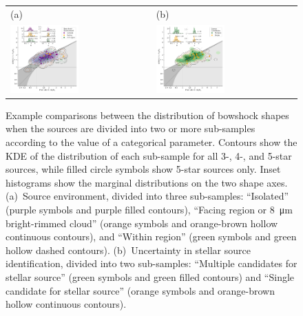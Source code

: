 \begin{figure}
  \setlength\tabcolsep{0pt}
  \begin{tabular}{ll}
    (a) & (b) \\
    \includegraphics[width=0.5\textwidth]{figs/mipsgal-Rc-R90-environment} &
    \includegraphics[width=0.5\textwidth]{figs/mipsgal-Rc-R90-candidates} 
  \end{tabular}
  \caption[]{Example comparisons between the distribution of bowshock
    shapes when the sources are divided into two or more sub-samples
    according to the value of a categorical parameter.  Contours show
    the KDE of the distribution of each sub-sample for all 3-, 4-, and
    5-star sources, while filled circle symbols show 5-star sources
    only. Inset histograms show the marginal distributions on the two
    shape axes. (a)~Source environment, divided into three
    sub-samples: ``Isolated'' (purple symbols and purple filled
    contours), ``Facing \hii{} region or \SI{8}{\um} bright-rimmed
    cloud'' (orange symbols and orange-brown hollow continuous
    contours), and ``Within \hii{} region'' (green symbols and green
    hollow dashed contours). (b)~Uncertainty in stellar source
    identification, divided into two sub-samples: ``Multiple
    candidates for stellar source'' (green symbols and green filled
    contours) and ``Single candidate for stellar source'' (orange
    symbols and orange-brown hollow continuous contours).}
  \label{fig:mipsgal-uncorrelated}
\end{figure}
